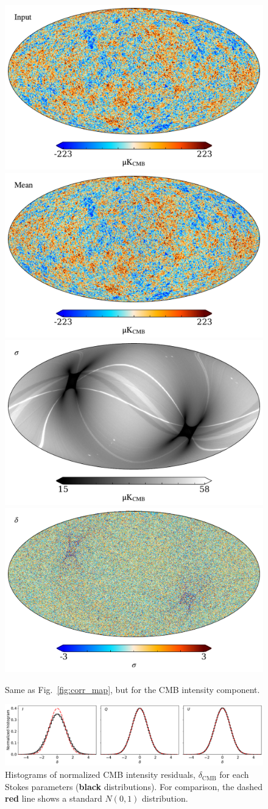 \documentclass[twocolumn]{aa}%
\begin{document}
\begin{figure}[t]
  \begin{center}
    \includegraphics[width=0.49\linewidth]{figs/input_cmb_map_nils.pdf}
    \includegraphics[width=0.49\linewidth]{figs/mean_cmb_map_nils.pdf}\\
    \includegraphics[width=0.49\linewidth]{figs/sigma_cmb_map_nils.pdf}
    \includegraphics[width=0.49\linewidth]{figs/residual_cmb_map_nils.pdf}
    \end{center}
    \caption{Same as Fig.~\ref{fig:corr_map}, but for the CMB intensity component.}
    \label{fig:cmb_map}

    \begin{center}
      \includegraphics[width=\linewidth]{figs/map_histogram_nils_v2.pdf}
    \end{center}
    \vspace*{-0.7cm}    
    \caption{Histograms of normalized CMB intensity residuals, $\delta_{\mathrm{CMB}}$ for each Stokes parameters (\textbf{black} distributions).  For comparison, the dashed \textbf{red} line shows a standard $N(0,1)$ distribution.}
    \label{fig:cmb_map_hist}
\end{figure}
\end{document}
